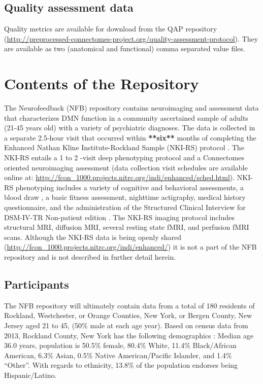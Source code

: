 \subsection{Quality assessment data}
Quality metrics are available for download from the QAP repository (\url{http://preprocessed-connectomes-project.org/quality-assessment-protocol}). They are available as two (anatomical and functional) comma separated value files.

\section{Contents of the Repository}
The Neurofeedback (NFB) repository contains neuroimaging and assessment data that characterizes DMN function in a community ascertained sample of adults (21-45 years old) with a variety of psychiatric diagnoses. The data is collected in a separate 2.5-hour visit that occurred within \textbf{**six**} months of completing the Enhanced Nathan Kline Institute-Rockland Sample (NKI-RS) protocol \cite{Nooner2012}. The NKI-RS entails a 1 to 2 -visit deep phenotyping protocol \cite{Nooner2012} and a Connectomes oriented neuroimaging assessment (data collection visit schedules are available online at: \url{http://fcon\_1000.projects.nitrc.org/indi/enhanced/sched.html}). NKI-RS phenotyping includes a variety of cognitive and behavioral assessments, a blood draw , a basic fitness assessment, nighttime actigraphy, medical history questionnaire, and the administration of the Structured Clinical Interview for DSM-IV-TR Non-patient edition \cite{First2002}. The NKI-RS imaging protocol includes structural MRI, diffusion MRI, several resting state fMRI, and perfusion fMRI scans. Although the NKI-RS data is being openly shared (\url{http://fcon\_1000.projects.nitrc.org/indi/enhanced/}) it is not a part of the NFB repository and is not described in further detail herein. 

\subsection{Participants}
The NFB repository will ultimately contain data from a total of 180 residents of Rockland, Westchester, or Orange Counties, New York, or Bergen County, New Jersey aged 21 to 45, (50\% male at each age year). Based on census data from 2013, Rockland County, New York has the following demographics \cite{Census2016}: Median age 36.0 years, population is 50.5\% female, 80.4\% White, 11.4\% Black/African American, 6.3\% Asian, 0.5\% Native American/Pacific Islander, and 1.4\% “Other”. With regards to ethnicity, 13.8\% of the population endorses being Hispanic/Latino.

